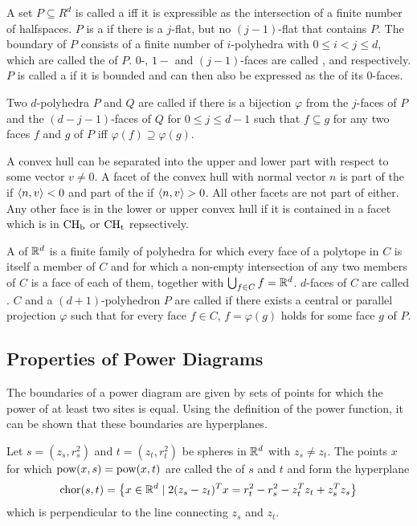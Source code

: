 A set $P \subseteq R^d$ is called a  iff it is expressible as the intersection of a finite number of halfspaces.
$P$ is a  if there is a $j$-flat, but no $(j-1)$-flat that contains $P$.
The boundary of $P$ consists of a finite number of $i$-polyhedra with $0 \leq i < j \leq d$, which are called the  of $P$.
$0$-, $1-$ and $(j - 1)$-faces are called ,  and  respectively.
$P$ is called a  if it is bounded and can then also be expressed as the  of its $0$-faces.

Two $d$-polyhedra $P$ and $Q$ are called  if there is a bijection $\varphi$ from the $j$-faces of $P$ and the $(d-j-1)$-faces of $Q$ for $0 \leq j \leq d  -1$ such that $f \subseteq g$ for any two faces $f$ and $g$ of $P$ iff $\varphi(f) \supseteq \varphi(g)$.

A convex hull can be separated into the upper and lower part with respect to some vector $v \neq 0$.
A facet of the convex hull with normal vector $n$ is part of the  if $\left\langle n, v \right\rangle < 0$ and part of the  if $\left\langle n, v \right\rangle > 0$.
All other facets are not part of either.
Any other face is in the lower or upper convex hull if it is contained in a facet which is in $\operatorname{CH_b}$ or $\operatorname{CH_t}$ repsectively.

A  of $\mathbb{R}^d$ is a finite family of polyhedra for which every face of a polytope in $C$ is itself a member of $C$ and for which a non-empty intersection of any two members of $C$ is a face of each of them, together with $\bigcup_{f \in C} f = \mathbb{R}^d$.
$d$-faces of $C$ are called .
$C$ and a $(d+1)$-polyhedron $P$ are called  if there exists a central or parallel projection $\varphi$ such that for every face $f \in C$, $f = \varphi(g)$ holds for some face $g$ of $P$.

\subsection{Properties of Power Diagrams}
\label{sub:properties_of_power_diagrams}
The boundaries of a power diagram are given by sets of points for which the power of at least two sites is equal.
Using the definition of the power function, it can be shown that these boundaries are hyperplanes.
\begin{observation}
    \label{obs:chordale}
    Let $s = (z_s, r^2_s)$ and $t = (z_t, r^2_t)$ be spheres in $\mathbb{R}^d$ with $z_s \neq z_t$. The points $x$ for which $\operatorname{pow}(x, s) = \operatorname{pow}(x, t)$ are called the  of $s$ and $t$ and form the hyperplane
    \begin{align}
        \operatorname{chor}(s, t) = \left\{ x \in \mathbb{R}^d \mid 2(z_s - z_t)^Tx = r_t^2 - r_s^2 - z_t^Tz_t + z_s^Tz_s \right\}
    \end{align}
    which is perpendicular to the line connecting $z_s$ and $z_t$.
\end{observation}

